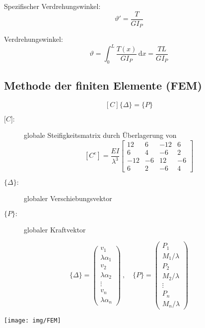 \documentclass{article}
\newcommand{\ud}{\,\mathrm{d}}
\begin{document}
\begin{multicols*}{4}
				Spezifischer Verdrehungswinkel:
				\[
					\vartheta ' = \frac{T}{GI_P}
				\]
			
				Verdrehungswinkel:
				\[
					\vartheta = \int_0^L \frac{T(x)}{GI_P} \ud x = \frac{TL}{GI_P}
				\]
			\subsection{Methode der finiten Elemente (FEM)} %
				\[
					[C] \{\Delta\} = \{P\}
				\]
				\begin{description}
					\item[$\lbrack C \rbrack:$] globale Steifigkeitsmatrix durch Überlagerung von
					\[
						[C^e] = \frac{EI}{\lambda^3} \left[\begin{array}{rrrr}
							12 & 6 & -12 & 6 \\
							6 & 4 & -6 & 2 \\
							-12 & -6 & 12 & -6 \\
							6 & 2 & -6 & 4
						\end{array}\right]
					\]
					\item[$\{\Delta\}:$] globaler Verschiebungsvektor
					\item[$\{P\}:$] globaler Kraftvektor
				\end{description}
				\[
					\{\Delta\} = \left(\begin{array}{c}
						v_1 \\
						\lambda \alpha_1 \\
						v_2 \\
						\lambda \alpha_2 \\
						\vdots \\
						v_n \\
						\lambda \alpha_n
					\end{array}\right) \ ,\quad
					\{P\} = \left(\begin{array}{c}
						P_1 \\
						M_1 / \lambda \\
						P_2 \\
						M_2 / \lambda \\
						\vdots \\
						P_n \\
						M_n / \lambda
					\end{array}\right)
				\]
				
				\begin{center}
					\texttt{[image: img/FEM]}
				\end{center}

\end{multicols*}
\end{document}
